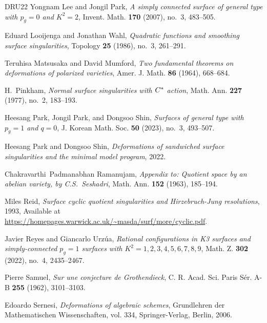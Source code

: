 \documentclass{amsart}
\theoremstyle{definition}
\theoremstyle{remark}
\begin{document}
\begin{thebibliography}{DRU22}
Yongnam Lee and Jongil Park, \emph{A simply connected surface of general type
  with {$p_g=0$} and {$K^2=2$}}, Invent. Math. \textbf{170} (2007), no.~3,
  483--505. 

Eduard Looijenga and Jonathan Wahl, \emph{Quadratic functions and smoothing
  surface singularities}, Topology \textbf{25} (1986), no.~3, 261--291.

Teruhisa Matsusaka and David Mumford, \emph{Two fundamental theorems on
  deformations of polarized varieties}, Amer. J. Math. \textbf{86} (1964),
  668--684. 

H.~Pinkham, \emph{Normal surface singularities with {$C\sp*$} action}, Math.
  Ann. \textbf{227} (1977), no.~2, 183--193. 

Heesang Park, Jongil Park, and Dongsoo Shin, \emph{Surfaces of general type
  with $p_g=1$ and $q=0$}, J. Korean Math. Soc. \textbf{50} (2023), no.~3,
  493--507.

Heesang Park and Dongsoo Shin, \emph{Deformations of sandwiched surface
  singularities and the minimal model program}, 2022.

Chakravarthi~Padmanabhan Ramanujam, \emph{Appendix to: {Q}uotient space by an
  abelian variety, by {C}.{S}.~{S}eshadri}, Math. Ann. \textbf{152} (1963),
  185--194.

Miles Reid, \emph{Surface cyclic quotient singularities and {H}irzebruch-{J}ung
  resolutions}, 1993, Available at
  \url{https://homepages.warwick.ac.uk/~masda/surf/more/cyclic.pdf}.

Javier Reyes and Giancarlo Urz\'{u}a, \emph{Rational configurations in {K}3
  surfaces and simply-connected {$p_g=1$} surfaces with
  {$K^2=1,2,3,4,5,6,7,8,9$}}, Math. Z. \textbf{302} (2022), no.~4, 2435--2467.

Pierre Samuel, \emph{Sur une conjecture de {G}rothendieck}, C. R. Acad. Sci.
  Paris S\'{e}r. A-B \textbf{255} (1962), 3101--3103.

Edoardo Sernesi, \emph{Deformations of algebraic schemes}, Grundlehren der
  Mathematischen Wissenschaften, vol. 334, Springer-Verlag, Berlin, 2006.


\end{thebibliography}
\end{document}
